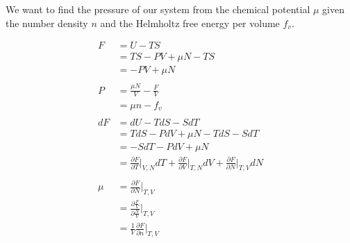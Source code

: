 \documentclass[double,12pt]{revtex4-2}
\begin{document}
We want to find the pressure of our system from the chemical potential 
$\mu$ given the number density $n$ and the Helmholtz free energy per 
volume $f_v$. 

\begin{align}
	F &= U - TS  \\
	  &= TS -PV + \mu N - TS  \\
	  &= -PV + \mu N  \\ \nonumber\\
%
	P &= \frac{\mu N}{V} - \frac{F}{V} \\
	  &= \mu n - f_v   \\ \nonumber\\
%
	dF &= dU - TdS -SdT \\
	   &= TdS - PdV + \mu N  - TdS -SdT\\
	   &=  -SdT - PdV + \mu N \\
	   &= \frac{\partial F}{\partial T}\bigg|_{V,N}dT 
	       + \frac{\partial F}{\partial V}\bigg|_{T,N}dV 
	       + \frac{\partial F}{\partial N}\bigg|_{T,V}dN \\ \nonumber\\
%
    \mu &= \frac{\partial F}{\partial N}\bigg|_{T,V} \\
        &= \frac{\partial \frac{F}{V}}{\partial \frac{N}{V}}\bigg|_{T,V}\\
        &= \frac{1}{V}\frac{\partial F}{\partial n}\bigg|_{T,V}        
\end{align}
\end{document}
